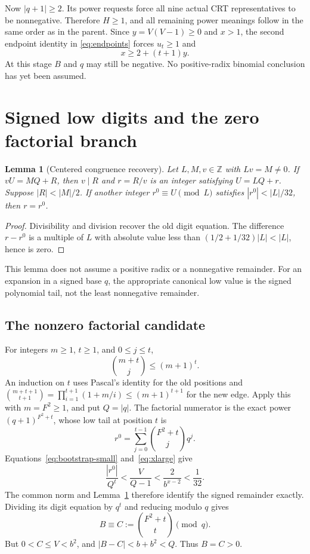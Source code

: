 \documentclass[11pt,letterpaper]{article}
\newtheorem{lemma}[theorem]{Lemma}
\theoremstyle{remark}\newtheorem{remark}[theorem]{Remark}
\newcommand{\Z}{\mathbb Z}\newcommand{\N}{\mathbb N}
\begin{document}
Now \(|q+1|\ge2\). Its power requests force all nine actual CRT
representatives to be nonnegative. Therefore \(H\ge1\), and all remaining
power meanings follow in the same order as in the parent. Since
\(y=V(V-1)\ge0\) and \(x>1\), the second endpoint identity in
\eqref{eq:endpoints} forces \(u_t\ge1\) and
\begin{equation}\label{eq:endpoint-bound}
 x\ge2+(t+1)y.
\end{equation}
At this stage \(B\) and \(q\) may still be negative. No positive-radix
binomial conclusion has yet been assumed.

\section{Signed low digits and the zero factorial branch}

\begin{lemma}[Centered congruence recovery]\label{lem:centered}
Let \(L,M,v\in\Z\) with \(Lv=M\ne0\). If
\(vU=MQ+R\), then \(v\mid R\) and \(r=R/v\) is an integer satisfying
\(U=LQ+r\). Suppose \(|R|<|M|/2\). If another integer
\(r^0\equiv U\pmod L\) satisfies \(|r^0|<|L|/32\), then
\(r=r^0\).
\end{lemma}
\begin{proof}
Divisibility and division recover the old digit equation. The difference
\(r-r^0\) is a multiple of \(L\) with absolute value less than
\((1/2+1/32)|L|<|L|\), hence is zero.
\end{proof}

This lemma does not assume a positive radix or a nonnegative remainder. For
an expansion in a signed base \(q\), the appropriate canonical low value is
the signed polynomial tail, not the least nonnegative remainder.

\subsection{The nonzero factorial candidate}

For integers \(m\ge1\), \(t\ge1\), and \(0\le j\le t\),
\begin{equation}\label{eq:coeffbound}
 \binom{m+t}{j}\le(m+1)^t.
\end{equation}
An induction on \(t\) uses Pascal's identity for the old positions and
\(\binom{m+t+1}{t+1}=\prod_{i=1}^{t+1}(1+m/i)\le(m+1)^{t+1}\)
for the new edge. Apply this with \(m=F^2\ge1\), and put \(Q=|q|\).
The factorial numerator is the exact power \((q+1)^{F^2+t}\), whose low
tail at position \(t\) is
\[
 r^0=\sum_{j=0}^{t-1}\binom{F^2+t}{j}q^j.
\]
Equations~\eqref{eq:bootstrap-small} and~\eqref{eq:xlarge} give
\[
 \frac{|r^0|}{Q^t}<\frac{V}{Q-1}
 <\frac{2}{b^{x-2}}<\frac1{32}.
\]
The common norm and Lemma~\ref{lem:centered} therefore identify the signed
remainder exactly. Dividing its digit equation by \(q^t\) and reducing
modulo \(q\) gives
\[
 B\equiv C:=\binom{F^2+t}{t}\pmod q.
\]
But \(0<C\le V<b^2\), and
\(|B-C|<b+b^2<Q\). Thus \(B=C>0\).
\end{document}
